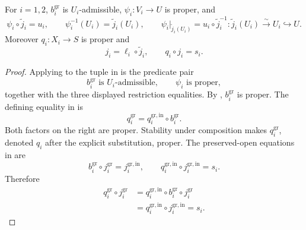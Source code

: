 \begin{lemma}
  \label{lemma:nagata-two-open-graph-extensions}

  For $i=1,2$, $b_i^{\mathrm{gr}}$ is $U_i$-admissible,
  $\psi_i\colon V_i\to U$ is proper, and
  \[
    \psi_i\circ\widetilde j_i=u_i,\qquad
    \psi_i^{-1}(U_i)=\widetilde j_i(U_i),\qquad
    \psi_i|_{\widetilde j_i(U_i)}
      =u_i\circ\widetilde j_i^{-1}\colon
        \widetilde j_i(U_i)\xrightarrow{\sim}U_i
        \hookrightarrow U.
  \]
  Moreover $q_i\colon X_i\to S$ is proper and
  \[
    j_i=\ell_i\circ\widetilde j_i,
    \qquad q_i\circ j_i=s_i.
  \]
\end{lemma}

\begin{proof}
  Applying  to the tuple in
   is the predicate pair
  \[
    b_i^{\mathrm{gr}}\text{ is }U_i\text{-admissible},\qquad
    \psi_i\text{ is proper},
  \]
  together with the three displayed restriction equalities.  By
  , $b_i^{\mathrm{gr}}$ is proper.  The
  defining equality in  is
  \[
    q_i^{\mathrm{gr}}=q_i^{\mathrm{gr,in}}\circ b_i^{\mathrm{gr}}.
  \]
  Both factors on the right are proper.  Stability under composition makes
  $q_i^{\mathrm{gr}}$, denoted $q_i$ after the explicit substitution, proper.
  The preserved-open equations in
   are
  \[
    b_i^{\mathrm{gr}}\circ j_i^{\mathrm{gr}}=j_i^{\mathrm{gr,in}},
    \qquad
    q_i^{\mathrm{gr,in}}\circ j_i^{\mathrm{gr,in}}=s_i.
  \]
  Therefore
  \[
  \begin{aligned}
    q_i^{\mathrm{gr}}\circ j_i^{\mathrm{gr}}
      &=q_i^{\mathrm{gr,in}}\circ b_i^{\mathrm{gr}}
          \circ j_i^{\mathrm{gr}}\\
      &=q_i^{\mathrm{gr,in}}\circ j_i^{\mathrm{gr,in}}
       =s_i.
  \end{aligned}
  \]
\end{proof}

